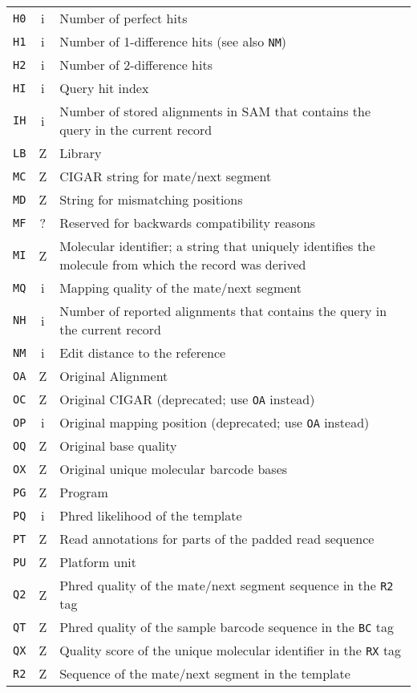 \documentclass[10pt]{article}
\begin{document}
\begin{center}
\begin{longtable}{ccp{12.5cm}}
  {\tt H0} & i & Number of perfect hits \\
  {\tt H1} & i & Number of 1-difference hits (see also {\tt NM}) \\
  {\tt H2} & i & Number of 2-difference hits \\
  {\tt HI} & i & Query hit index \\
  {\tt IH} & i & Number of stored alignments in SAM that contains the query in the current record \\
  {\tt LB} & Z & Library \\
  {\tt MC} & Z & CIGAR string for mate/next segment \\
  {\tt MD} & Z & String for mismatching positions \\
  {\tt MF} & ? & Reserved for backwards compatibility reasons \\
  {\tt MI} & Z & Molecular identifier; a string that uniquely identifies the molecule from which the record was derived \\
  {\tt MQ} & i & Mapping quality of the mate/next segment \\
  {\tt NH} & i & Number of reported alignments that contains the query in the current record \\
  {\tt NM} & i & Edit distance to the reference \\
  {\tt OA} & Z & Original Alignment \\
  {\tt OC} & Z & Original CIGAR (deprecated; use {\tt OA} instead) \\
  {\tt OP} & i & Original mapping position (deprecated; use {\tt OA} instead) \\
  {\tt OQ} & Z & Original base quality \\
  {\tt OX} & Z & Original unique molecular barcode bases \\
  {\tt PG} & Z & Program \\
  {\tt PQ} & i & Phred likelihood of the template \\
  {\tt PT} & Z & Read annotations for parts of the padded read sequence \\
  {\tt PU} & Z & Platform unit \\
  {\tt Q2} & Z & Phred quality of the mate/next segment sequence in the {\tt R2} tag \\
  {\tt QT} & Z & Phred quality of the sample barcode sequence in the {\tt BC} tag \\
  {\tt QX} & Z & Quality score of the unique molecular identifier in the {\tt RX} tag \\
  {\tt R2} & Z & Sequence of the mate/next segment in the template \\

\end{longtable}
\end{center}
\end{document}
